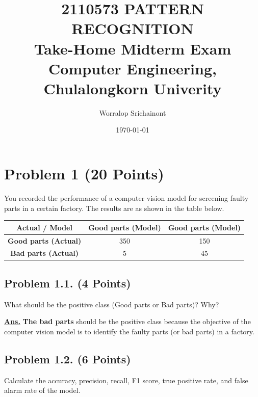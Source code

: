 \documentclass[12pt, a4paper]{article}
\title {
	\textbf{2110573 PATTERN RECOGNITION} \\
    \vspace{1em}
	\Large{\textbf{Take-Home Midterm Exam}} \\
    \vspace{0.5em}
    \large{Computer Engineering, Chulalongkorn Univerity}
}
\author{Worralop Srichainont}
\date{\today}
\begin{document}
    \maketitle
    \thispagestyle{empty}
    \clearpage

    \tableofcontents
    \thispagestyle{empty}
    \clearpage


    \section{Problem 1 (20 Points)}
        You recorded the performance of a computer vision model for screening faulty parts in a certain factory. The results are as shown in the table below.
        \begin{table}[h]
            \centering
            \begin{tabular}{|c|c|c|}
                \hline
                \textbf{Actual / Model} & \textbf{Good parts (Model)} & \textbf{Good parts (Model)} \\
                \hline \hline
                \textbf{Good parts (Actual)} & 350 & 150 \\
                \hline
                \textbf{Bad parts (Actual)} & 5 & 45 \\
                \hline
            \end{tabular}
        \end{table}

        \subsection{Problem 1.1. (4 Points)}
            What should be the positive class (Good parts or Bad parts)? Why?

            \vspace{1em}

            \noindent \underline{\textbf{Ans.}} \textbf{The bad parts} should be the positive class because the objective of the computer vision model is to identify the faulty parts (or bad parts) in a factory.

        \subsection{Problem 1.2. (6 Points)}
            Calculate the accuracy, precision, recall, F1 score, true positive rate, and false alarm rate of the model.
\end{document}
